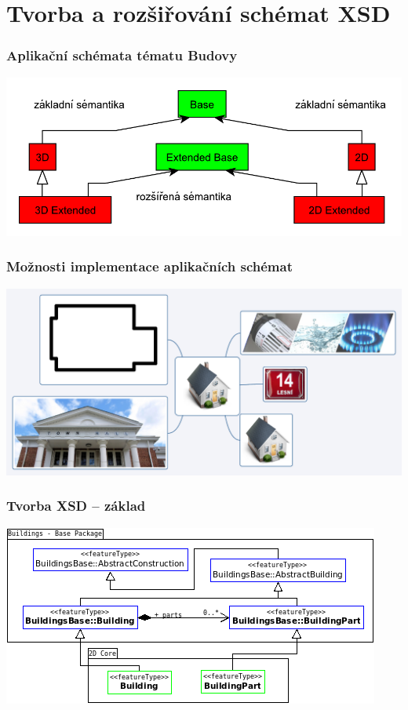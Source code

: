 \section{Tvorba a rozšiřování schémat XSD}

\begin{frame}
\frametitle{Aplikační schémata tématu Budovy}
\begin{center}
\includegraphics[scale=0.7]{obrazky/BU_schemas.pdf}
\end{center}
\end{frame}

\begin{frame}
\frametitle{Možnosti implementace aplikačních schémat}
\begin{center}
\includegraphics[scale=0.3]{obrazky/connection.png}
\end{center}
\end{frame}

\begin{frame}
\frametitle{Tvorba XSD -- základ}
\begin{center}
\includegraphics[scale=0.65]{obrazky/BuildingsBase2D.png}
\end{center}
\end{frame}

